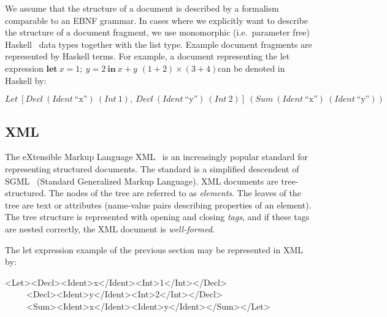 We assume that the structure of a document is described by a formalism comparable to an EBNF grammar. In cases where we explicitly want to describe the structure of a document fragment, we use monomorphic (i.e.\ parameter free) Haskell~\cite{peytonJones03haskell} data types together with the list type. Example document fragments are represented by Haskell terms. For example, a document representing the let expression  $\mathbf{let}~x = 1;~y = 2~\mathbf{in}~x+y$
\bc $(1+2) \times (3 + 4)$\ec can be denoted in Haskell by: 

\begin{small}
$Let~[Decl~(Ident~\text{``x''})~(Int~1),~Decl~(Ident~\text{``y''})~(Int~2)]~(Sum~(Ident~\text{``x''})~(Ident~\text{``y''}))$
\end{small}

\subsection{XML}


The eXtensible Markup Language XML~\cite{xml11} is an increasingly popular standard for representing structured documents. The standard is a simplified descendent of SGML~\cite{sgml86} (Standard Generalized Markup Language). XML documents are tree-structured. The nodes of the tree are referred to as {\em elements}. The leaves of the tree are text or attributes (name-value pairs describing properties of an element). The tree structure is represented with opening and closing {\em tags}, and if these tags are nested correctly, the XML document is {\em well-formed}.

The let expression example of the previous section may be represented in XML by:

\ttfamily\begin{small}\begin{tabbing}
<Let><Decl><Ident>x</Ident><Int>1</Int></Decl>\\
~~~~~<Decl><Ident>y</Ident><Int>2</Int></Decl>\\
~~~~~<Sum><Ident>x</Ident><Ident>y</Ident></Sum></Let>
\end{tabbing}\end{small}\rmfamily


